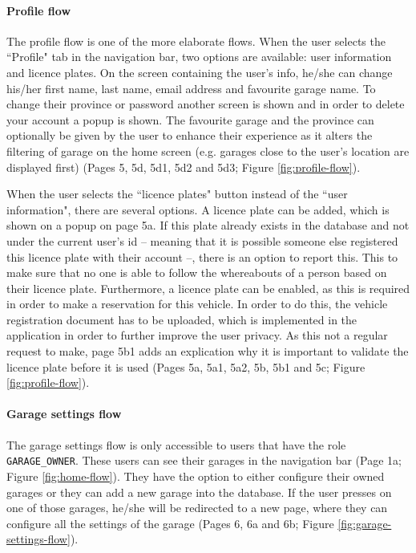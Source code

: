 \paragraph{Profile flow}\label{sec:profile-flow}
The profile flow is one of the more elaborate flows. When the user selects the ``Profile" tab in the navigation bar, two options are available: user information and licence plates. On the screen containing the user's info, he/she can change his/her first name, last name, email address and favourite garage name. To change their province or password another screen is shown and in order to delete your account a popup is shown. The favourite garage and the province can optionally be given by the user to enhance their experience as it alters the filtering of garage on the home screen (e.g. garages close to the user's location are displayed first) (Pages 5, 5d, 5d1, 5d2 and 5d3; Figure \ref{fig:profile-flow}).

\ind When the user selects the ``licence plates" button instead of the ``user information", there are several options. A licence plate can be added, which is shown on a popup on page 5a. If this plate already exists in the database and not under the current user's id -- meaning that it is possible someone else registered this licence plate with their account --, there is an option to report this. This to make sure that no one is able to follow the whereabouts of a person based on their licence plate. Furthermore, a licence plate can be enabled, as this is required in order to make a reservation for this vehicle. In order to do this, the vehicle registration document has to be uploaded, which is implemented in the application in order to further improve the user privacy. As this not a regular request to make, page 5b1 adds an explication why it is important to validate the licence plate before it is used (Pages 5a, 5a1, 5a2, 5b, 5b1 and 5c; Figure \ref{fig:profile-flow}).

\paragraph{Garage settings flow}
The garage settings flow is only accessible to users that have the role \verb+GARAGE_OWNER+. These users can see their garages in the navigation bar (Page 1a; Figure \ref{fig:home-flow}). They have the option to either configure their owned garages or they can add a new garage into the database. If the user presses on one of those garages, he/she will be redirected to a new page, where they can configure all the settings of the garage (Pages 6, 6a and 6b; Figure \ref{fig:garage-settings-flow}). 

